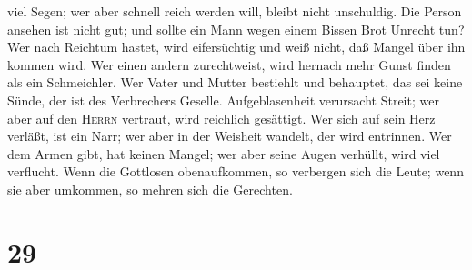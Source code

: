 viel Segen; wer aber schnell reich werden will, bleibt nicht unschuldig.
 Die Person ansehen ist nicht gut; und sollte ein Mann
wegen einem Bissen Brot Unrecht tun?  Wer nach Reichtum
hastet, wird eifersüchtig und weiß nicht, daß Mangel über ihn kommen
wird.  Wer einen andern zurechtweist, wird hernach mehr
Gunst finden als ein Schmeichler.  Wer Vater und Mutter
bestiehlt und behauptet, das sei keine Sünde, der ist des Verbrechers
Geselle.  Aufgeblasenheit verursacht Streit; wer aber auf
den \textsc{Herrn} vertraut, wird reichlich gesättigt. 
Wer sich auf sein Herz verläßt, ist ein Narr; wer aber in der Weisheit
wandelt, der wird entrinnen.  Wer dem Armen gibt, hat
keinen Mangel; wer aber seine Augen verhüllt, wird viel verflucht.
 Wenn die Gottlosen obenaufkommen, so verbergen sich die
Leute; wenn sie aber umkommen, so mehren sich die Gerechten.

\hypertarget{section-28}{%
\section{29}\label{section-28}}

